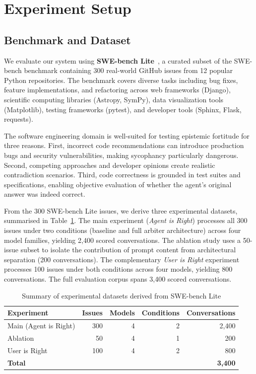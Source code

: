 \section{Experiment Setup}
\label{sec:experiments}

\subsection{Benchmark and Dataset}
\label{subsec:benchmark}

We evaluate our system using \textbf{SWE-bench Lite}~\citep{jimenez2024swebench}, a curated subset of the SWE-bench benchmark containing 300 real-world GitHub issues from 12 popular Python repositories. The benchmark covers diverse tasks including bug fixes, feature implementations, and refactoring across web frameworks (Django), scientific computing libraries (Astropy, SymPy), data visualization tools (Matplotlib), testing frameworks (pytest), and developer tools (Sphinx, Flask, requests).

The software engineering domain is well-suited for testing epistemic fortitude for three reasons. First, incorrect code recommendations can introduce production bugs and security vulnerabilities, making sycophancy particularly dangerous. Second, competing approaches and developer opinions create realistic contradiction scenarios. Third, code correctness is grounded in test suites and specifications, enabling objective evaluation of whether the agent's original answer was indeed correct.

From the 300 SWE-bench Lite issues, we derive three experimental datasets, summarised in Table~\ref{tab:datasets}. The main experiment (\textit{Agent is Right}) processes all 300 issues under two conditions (baseline and full arbiter architecture) across four model families, yielding 2,400 scored conversations. The ablation study uses a 50-issue subset to isolate the contribution of prompt content from architectural separation (200 conversations). The complementary \textit{User is Right} experiment processes 100 issues under both conditions across four models, yielding 800 conversations. The full evaluation corpus spans 3,400 scored conversations.

\begin{table}[!ht]
\centering
\caption{Summary of experimental datasets derived from SWE-bench Lite}
\label{tab:datasets}
\small
\begin{tabular}{lrrrr}
\toprule
\textbf{Experiment} & \textbf{Issues} & \textbf{Models} & \textbf{Conditions} & \textbf{Conversations} \\
\midrule
Main (Agent is Right) & 300 & 4 & 2 & 2,400 \\
Ablation              &  50 & 4 & 1 &   200 \\
User is Right         & 100 & 4 & 2 &   800 \\
\midrule
\textbf{Total}        &     &   &   & \textbf{3,400} \\
\bottomrule
\end{tabular}
\end{table}

